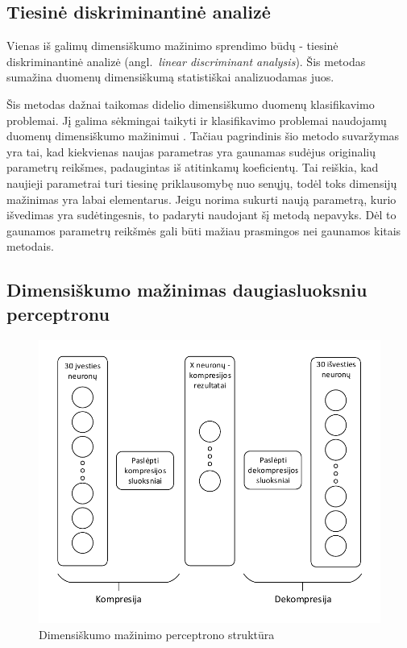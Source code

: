 \documentclass{VUMIFPSbakalaurinis}
\begin{document}
\subsection{Tiesinė diskriminantinė analizė}

Vienas iš galimų dimensiškumo mažinimo sprendimo būdų - tiesinė diskriminantinė analizė (angl.~\textit{linear discriminant analysis}).
Šis metodas sumažina duomenų dimensiškumą statistiškai analizuodamas juos.

Šis metodas dažnai taikomas didelio dimensiškumo duomenų klasifikavimo problemai.
Jį galima sėkmingai taikyti ir klasifikavimo problemai naudojamų duomenų dimensiškumo mažinimui \cite[289~psl.]{price-dimensionality-reduction}.
Tačiau pagrindinis šio metodo suvaržymas yra tai, kad kiekvienas naujas parametras yra gaunamas sudėjus originalių parametrų reikšmes, padaugintas iš atitinkamų koeficientų.
Tai reiškia, kad naujieji parametrai turi tiesinę priklausomybę nuo senųjų, todėl toks dimensijų mažinimas yra labai elementarus.
Jeigu norima sukurti naują parametrą, kurio išvedimas yra sudėtingesnis, to padaryti naudojant šį metodą nepavyks.
Dėl to gaunamos parametrų reikšmės gali būti mažiau prasmingos nei gaunamos kitais metodais.



\subsection{Dimensiškumo mažinimas daugiasluoksniu perceptronu} \label{dimensionality-reduction-perceptron}

\begin{figure}[h]
	\centering
	\includegraphics[scale=0.75]{diagrams/compression_perceptron}
	\caption{Dimensiškumo mažinimo perceptrono struktūra}
	\label{fig:compression_perceptron}
\end{figure}
\end{document}
